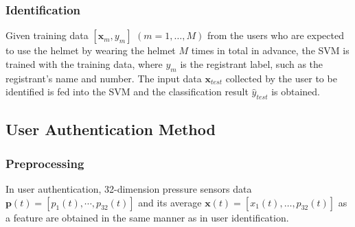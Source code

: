 \documentclass[sigchi,authordraft]{acmart}
\begin{document}
\subsubsection{Identification}
Given training data $[\bm{x}_m,y_m]$ $(m=1,\dots, M)$ from the users who are expected to use the helmet by wearing the helmet $M$ times in total in advance, the SVM is trained with the training data, where $y_m$ is the registrant label, such as the registrant's name and number. The input data $\bm{x}_{test}$ collected by the user to be identified is fed into the SVM and the classification result $\hat{y}_{test}$ is obtained.


\subsection{User Authentication Method}
\subsubsection{Preprocessing}
In user authentication, 32-dimension pressure sensors data $\bm{p}(t)=[p_1(t),\cdots,p_{32}(t)]$ and its average $\bm{x}(t)=[x_{1}(t),\dots,p_{32}(t)]$ as a feature are obtained in the same manner as in user identification. 

\end{document}

